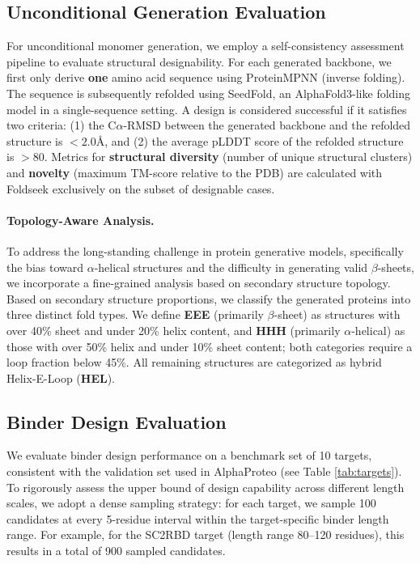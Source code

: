 \subsection{Unconditional Generation Evaluation}
For unconditional monomer generation, we employ a self-consistency assessment pipeline to evaluate structural designability. For each generated backbone, we first only derive \textbf{one} amino acid sequence using ProteinMPNN (inverse folding). The sequence is subsequently refolded using SeedFold, an AlphaFold3-like folding model in a single-sequence setting. A design is considered successful if it satisfies two criteria: 
(1) the C$\alpha$-RMSD between the generated backbone and the refolded structure is $< 2.0$\AA, and 
(2) the average pLDDT score of the refolded structure is $> 80$. 
Metrics for \textbf{structural diversity} (number of unique structural clusters) and \textbf{novelty} (maximum TM-score relative to the PDB) are calculated with Foldseek \cite{vankempenFastAccurateProtein2024} exclusively on the subset of designable cases.

\paragraph{Topology-Aware Analysis.}
To address the long-standing challenge in protein generative models, specifically the bias toward $\alpha$-helical structures and the difficulty in generating valid $\beta$-sheets, we incorporate a fine-grained analysis based on secondary structure topology. Based on secondary structure proportions, we classify the generated proteins into three distinct fold types. We define \textbf{EEE} (primarily $\beta$-sheet) as structures with over 40\% sheet and under 20\% helix content, and \textbf{HHH} (primarily $\alpha$-helical) as those with over 50\% helix and under 10\% sheet content; both categories require a loop fraction below 45\%. All remaining structures are categorized as hybrid Helix-E-Loop (\textbf{HEL}).

\subsection{Binder Design Evaluation}
We evaluate binder design performance on a benchmark set of 10 targets, consistent with the validation set used in AlphaProteo (see Table \ref{tab:targets}). To rigorously assess the upper bound of design capability across different length scales, we adopt a dense sampling strategy: for each target, we sample 100 candidates at every 5-residue interval within the target-specific binder length range. For example, for the SC2RBD target (length range 80--120 residues), this results in a total of 900 sampled candidates.

